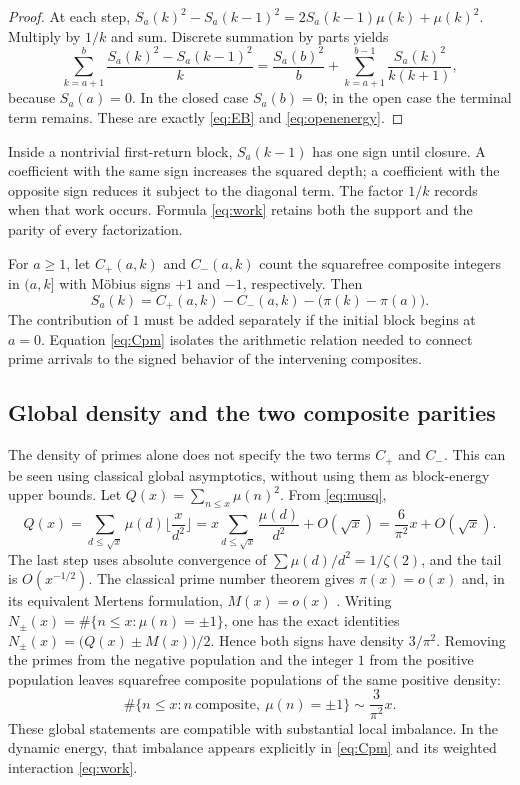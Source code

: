 \documentclass[11pt]{article}
\theoremstyle{definition}
\theoremstyle{remark}
\begin{document}
\begin{proof}
At each step, $S_a(k)^2-S_a(k-1)^2=2S_a(k-1)\mu(k)+\mu(k)^2$. Multiply by $1/k$ and sum. Discrete summation by parts yields
\[
\sum_{k=a+1}^b\frac{S_a(k)^2-S_a(k-1)^2}{k}=\frac{S_a(b)^2}{b}+\sum_{k=a+1}^{b-1}\frac{S_a(k)^2}{k(k+1)},
\]
because $S_a(a)=0$. In the closed case $S_a(b)=0$; in the open case the terminal term remains. These are exactly \eqref{eq:EB} and \eqref{eq:openenergy}.
\end{proof}

Inside a nontrivial first-return block, $S_a(k-1)$ has one sign until closure. A coefficient with the same sign increases the squared depth; a coefficient with the opposite sign reduces it subject to the diagonal term. The factor $1/k$ records when that work occurs. Formula \eqref{eq:work} retains both the support and the parity of every factorization.

For $a\ge1$, let $C_+(a,k)$ and $C_-(a,k)$ count the squarefree composite integers in $(a,k]$ with M\"obius signs $+1$ and $-1$, respectively. Then
\begin{equation}\label{eq:Cpm}
S_a(k)=C_+(a,k)-C_-(a,k)-\big(\pi(k)-\pi(a)\big).
\end{equation}
The contribution of $1$ must be added separately if the initial block begins at $a=0$. Equation \eqref{eq:Cpm} isolates the arithmetic relation needed to connect prime arrivals to the signed behavior of the intervening composites.

\subsection{Global density and the two composite parities}

The density of primes alone does not specify the two terms $C_+$ and $C_-$. This can be seen using classical global asymptotics, without using them as block-energy upper bounds. Let $Q(x)=\sum_{n\le x}\mu(n)^2$. From \eqref{eq:musq},
\begin{equation}
Q(x)=\sum_{d\le\sqrt x}\mu(d)\Big\lfloor\frac{x}{d^2}\Big\rfloor=x\sum_{d\le\sqrt x}\frac{\mu(d)}{d^2}+O(\sqrt x)=\frac6{\pi^2}x+O(\sqrt x).
\end{equation}
The last step uses absolute convergence of $\sum\mu(d)/d^2=1/\zeta(2)$, and the tail is $O(x^{-1/2})$. The classical prime number theorem gives $\pi(x)=o(x)$ and, in its equivalent Mertens formulation, $M(x)=o(x)$ \cite{dlmf2711}. Writing $N_\pm(x)=\#\{n\le x:\mu(n)=\pm1\}$, one has the exact identities $N_\pm(x)=\big(Q(x)\pm M(x)\big)/2$. Hence both signs have density $3/\pi^2$. Removing the primes from the negative population and the integer $1$ from the positive population leaves squarefree composite populations of the same positive density:
\begin{equation}
\#\{n\le x: n\ \text{composite},\ \mu(n)=\pm1\}\sim\frac3{\pi^2}x.
\end{equation}
These global statements are compatible with substantial local imbalance. In the dynamic energy, that imbalance appears explicitly in \eqref{eq:Cpm} and its weighted interaction \eqref{eq:work}.
\end{document}
